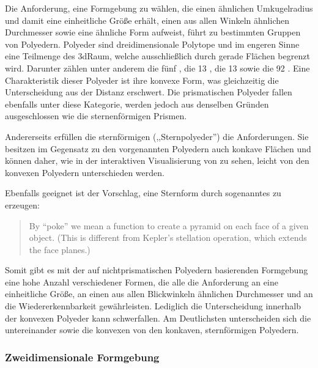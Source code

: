 Die Anforderung, eine Formgebung zu wählen, die einen ähnlichen Umkugelradius und damit eine einheitliche Größe erhält, einen aus allen Winkeln ähnlichen Durchmesser sowie eine ähnliche Form aufweist, führt zu bestimmten Gruppen von Polyedern. Polyeder sind dreidimensionale Polytope und im engeren Sinne eine Teilmenge des \gls{3dRaum}, welche ausschließlich durch gerade Flächen begrenzt wird. Darunter zählen unter anderem die fünf  \cite{RegularPolyhedra}, die 13 , die 13  sowie die 92  \cite{JohnsonPolyeder}. Eine Charakteristik dieser Polyeder ist ihre konvexe Form, was gleichzeitig die Unterscheidung aus der Distanz erschwert. Die prismatischen Polyeder fallen ebenfalls unter diese Kategorie, werden jedoch aus denselben Gründen ausgeschlossen wie die sternenförmigen Prismen.

Andererseits erfüllen die sternförmigen  (,,Sternpolyeder'') die Anforderungen. Sie besitzen im Gegensatz zu den vorgenannten Polyedern auch konkave Flächen \cite{KeplerPoinsotSolid} und können daher, wie in der interaktiven Visualisierung von \cite{WebGLUniformPolyhedra} zu sehen, leicht von den konvexen Polyedern unterschieden werden.

Ebenfalls geeignet ist der Vorschlag, eine Sternform durch sogenanntes  zu erzeugen: \blockcquote[4]{ProceduralGenerationofSculpturalForms}{By “poke” we mean a function to create a pyramid on each face of a given object. (This is different from Kepler’s stellation operation, which extends the face planes.)}

Somit gibt es mit der auf nichtprismatischen Polyedern basierenden Formgebung eine hohe Anzahl verschiedener Formen, die alle die Anforderung an eine einheitliche Größe, an einen aus allen Blickwinkeln ähnlichen Durchmesser und an die Wiedererkennbarkeit gewährleisten. Lediglich die Unterscheidung innerhalb der konvexen Polyeder kann schwerfallen. Am Deutlichsten unterscheiden sich die  untereinander sowie die konvexen von den konkaven, sternförmigen Polyedern.


\subsubsection{Zweidimensionale Formgebung}\label{sec:related-2dformgebung}

